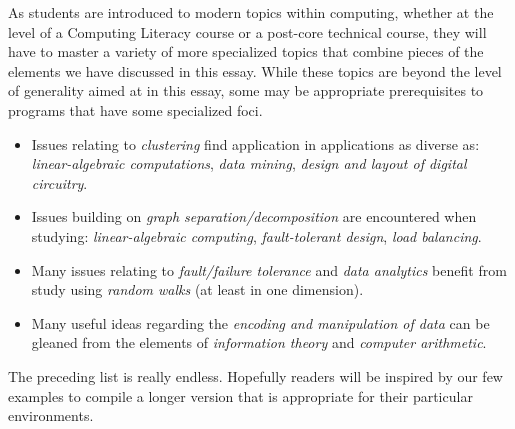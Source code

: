 As students are introduced to modern topics within computing, whether
at the level of a Computing Literacy course or a post-core technical
course, they will have to master a variety of more specialized topics
that combine pieces of the elements we have discussed in this essay.
While these topics are beyond the level of generality aimed at in this
essay, some may be appropriate prerequisites to programs that have
some specialized foci.
\begin{itemize}
\item
Issues relating to {\em clustering} find application in applications as
diverse as: {\em linear-algebraic computations}, {\em data mining},
{\em design and layout of digital circuitry}.

\item
Issues building on {\em graph separation/decomposition} are
encountered when studying: {\em linear-algebraic computing}, {\em
  fault-tolerant design}, {\em load balancing}.

\item
Many issues relating to {\em fault/failure tolerance} and {\em data
  analytics} benefit from study using {\em random walks} (at least in
one dimension).

\item
Many useful ideas regarding the {\em encoding and manipulation of
  data} can be gleaned from the elements of {\em information theory}
and {\em computer arithmetic}.
\end{itemize}
The preceding list is really endless.  Hopefully readers will be
inspired by our few examples to compile a longer version that is
appropriate for their particular environments.




